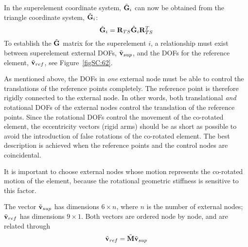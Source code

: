 {In the superelement coordinate system, $\tilde{\bf G}_i$ can now be obtained
from the triangle coordinate system, $\hat{\bf G}_i$:
%
\begin{equation}
\tilde{\bf G}_i = {\bf R}_{TS}\hat{\bf G}_i {\bf R}_{TS}^T
\label{eqSC:619}
\end{equation}
%
To establish the $\tilde{\bf G}$ matrix for the superelement $i$,
a relationship must exist between superelement external DOFs,
$\tilde{\bf v}_{sup}$, and the DOFs for the reference element,
$\tilde{\bf v}_{ref}$, see Figure~\ref{figSC:62}.

As mentioned above, the DOFs in \textit{one} external node must be able to
control the translations of the reference points completely.
The reference point is therefore rigidly connected to the external node.
In other words, both translational \textit{and} rotational DOFs of the external
nodes control the translation of the reference points.
Since the rotational DOFs control the movement of the co-rotated element,
the eccentricity vectors (rigid arms) should be as short as possible to avoid
the introduction of false rotations of the co-rotated element.
The best description is achieved when the reference points and the control nodes
are coincidental.

It is important to choose external nodes whose motion represents the co-rotated
motion of the element, because the rotational geometric stiffness is sensitive
to this factor.

The vector $\tilde{\bf v}_{sup}$ has dimensions $6\times n$, where $n$ is the
number of external nodes; $\tilde{\bf v}_{ref}$ has dimensions $9\times1$.
Both vectors are ordered node by node, and are related through
%
\begin{equation}
\tilde{\bf v}_{ref} = \tilde{\bf M} \tilde{\bf v}_{sup}
\label{eqSC:620}
\end{equation}

}
